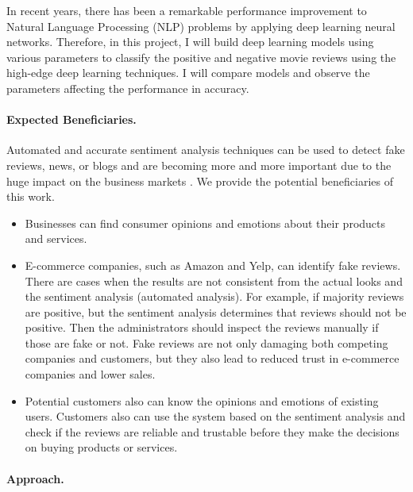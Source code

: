\documentclass[11pt]{article}
\begin{document}
In recent years, there has been a remarkable performance improvement
to Natural Language Processing (NLP) problems
by applying deep learning neural networks.
%
Therefore, in this project, I will build deep learning models using various parameters to classify the positive and negative movie reviews using the high-edge deep learning techniques. I will compare models and observe the parameters affecting the performance in accuracy.

\paragraph*{Expected Beneficiaries.}

Automated and accurate sentiment analysis techniques can be used to detect fake reviews, news, or blogs and are becoming more and more important due to the huge impact on the business markets \cite{DeepLearning_amazon} \cite{fakespot}. We provide the potential beneficiaries of this work.

\begin{itemize}
\item 	
Businesses can find consumer opinions and emotions about their products and services.
\item
E-commerce companies, such as Amazon and Yelp, can identify fake reviews. 
%
There are cases when the results are not consistent from the actual looks and the sentiment analysis (automated analysis). 
For example, if majority reviews are positive, but the sentiment analysis determines that reviews should not be positive.
%
Then the administrators should inspect the reviews manually if those are fake or not.
%
Fake reviews are not only damaging both competing companies and customers, but they also lead to reduced trust in e-commerce companies and lower sales.
\item
Potential customers also can know the opinions and emotions of existing users.
%
Customers also can use the system based on the sentiment analysis \cite{fakespot} and check if the reviews are reliable and trustable before they make the decisions on buying products or services.
\end{itemize}

\paragraph*{Approach.}
\end{document}
